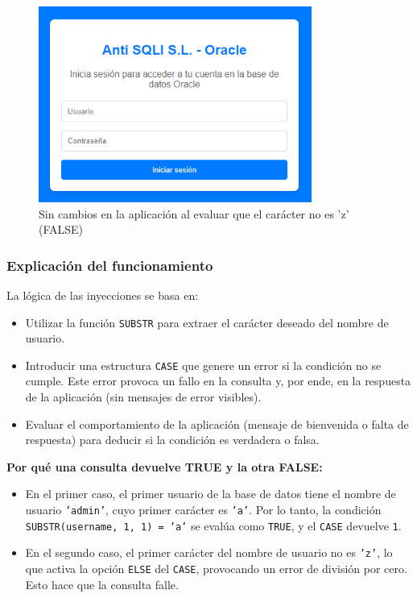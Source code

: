 \documentclass[a4paper,12pt]{article}
\begin{document}
\begin{figure}[H]
    \centering
    \includegraphics[width=0.8\textwidth]{Imagenes/blind5.png}
    \caption{Sin cambios en la aplicación al evaluar que el carácter no es 'z' (FALSE)}
\end{figure}

\subsubsection{Explicación del funcionamiento}

La lógica de las inyecciones se basa en:
\begin{itemize}
    \item Utilizar la función \texttt{SUBSTR} para extraer el carácter deseado del nombre de usuario.
    \item Introducir una estructura \texttt{CASE} que genere un error si la condición no se cumple. Este error provoca un fallo en la consulta y, por ende, en la respuesta de la aplicación (sin mensajes de error visibles).
    \item Evaluar el comportamiento de la aplicación (mensaje de bienvenida o falta de respuesta) para deducir si la condición es verdadera o falsa.
\end{itemize}

\textbf{Por qué una consulta devuelve TRUE y la otra FALSE:}
\begin{itemize}
    \item En el primer caso, el primer usuario de la base de datos tiene el nombre de usuario \texttt{'admin'}, cuyo primer carácter es \texttt{'a'}. Por lo tanto, la condición \texttt{SUBSTR(username, 1, 1) = 'a'} se evalúa como \texttt{TRUE}, y el \texttt{CASE} devuelve \texttt{1}.
    \item En el segundo caso, el primer carácter del nombre de usuario no es \texttt{'z'}, lo que activa la opción \texttt{ELSE} del \texttt{CASE}, provocando un error de división por cero. Esto hace que la consulta falle.
\end{itemize}
\end{document}

